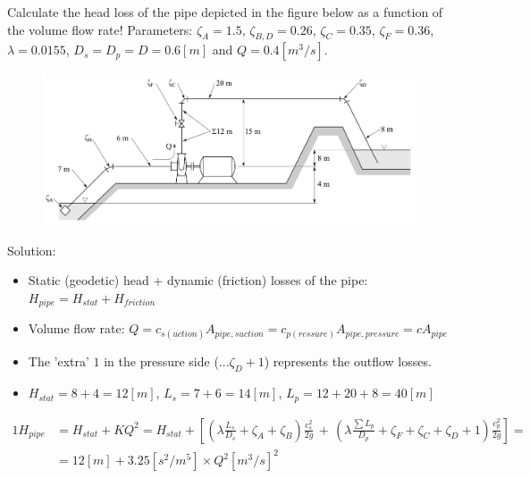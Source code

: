 Calculate the head loss of the pipe depicted in the figure below as a function of the volume flow rate! Parameters: $\zeta_A=1.5$, $\zeta_{B,D}=0.26$, $\zeta_C=0.35$, $\zeta_F=0.36$, $\lambda=0.0155$, $D_s=D_p=D=0.6[m]$ and $Q=0.4[m^3/s]$. 
% 
\begin{figure}[ht]
\begin{center}
\includegraphics{Problem_solving/figs/PS_HydraulicSystems1.png}
\end{center}
\end{figure}
%
\noindent Solution:
%
\begin{itemize}
\item Static (geodetic) head + dynamic (friction) losses of the pipe: $H_{pipe}=H_{stat}+H_{friction}$
\item Volume flow rate: $Q=c_{s(uction)}A_{pipe,suction}=c_{p(ressure)}A_{pipe,pressure}=c A_{pipe}$
\item The 'extra' $1$ in the pressure side ($...\zeta_D+1$) represents the outflow losses.
\item $H_{stat}=8+4=12[m]$, $L_s=7+6=14[m]$, $L_p=12+20+8=40[m]$
\end{itemize}
%
\begin{alignat*}{1}
H_{pipe}&=H_{stat}+KQ^2= H_{stat}+\left[ \left( \lambda\frac{L_s}{D_s}+\zeta_A+\zeta_B\right)\frac{c_s^2}{2g}\,+\,\left( \lambda\frac{\sum L_p}{D_p}+\zeta_F+\zeta_C+\zeta_D+1\right)\frac{c_p^2}{2g}\right]=\\
	&=12[m]+3.25[s^2/m^5] \times Q^2 [m^3/s]^2
\end{alignat*}


\vspace{1cm}

